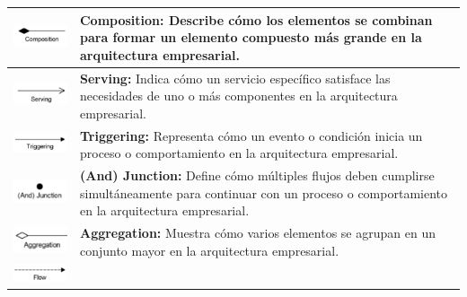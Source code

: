 \begin{longtable}{|c|p{8cm}|}
	\endlastfoot
	\includegraphics{anexos/ARCHI/relations/compostion.png}     &
	\textbf{Composition:} Describe cómo los elementos se combinan para formar un elemento compuesto más grande en la arquitectura empresarial.                           \\
	\hline
	\includegraphics{anexos/ARCHI/relations/serving.png}        &
	\textbf{Serving:} Indica cómo un servicio específico satisface las necesidades de uno o más componentes en la arquitectura empresarial.                              \\
	\hline
	\includegraphics{anexos/ARCHI/relations/triggering.png}     &
	\textbf{Triggering:} Representa cómo un evento o condición inicia un proceso o comportamiento en la arquitectura empresarial.                                        \\
	\hline
	\includegraphics{anexos/ARCHI/relations/and.png}            &
	\textbf{(And) Junction:} Define cómo múltiples flujos deben cumplirse simultáneamente para continuar con un proceso o comportamiento en la arquitectura empresarial. \\
	\hline
	\includegraphics{anexos/ARCHI/relations/aggregation.png}    &
	\textbf{Aggregation:} Muestra cómo varios elementos se agrupan en un conjunto mayor en la arquitectura empresarial.                                                  \\
	\hline
	\includegraphics{anexos/ARCHI/relations/flow.png}           &

\end{longtable}
